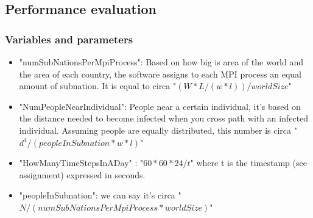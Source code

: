 \documentclass[table, 12pt]{article}
\begin{document}
\subsection{Performance evaluation}

\subsubsection{Variables and parameters}
\begin{flushleft}
\begin{itemize}
\setlength\itemsep{-0.5em}
\item "numSubNationsPerMpiProcess": Based on how big is area of the world and the area of each country, the software assigns to each MPI process an equal amount of subnation. It is equal to circa "$ (W*L/(w*l)) / worldSize $"
\item "NumPeopleNearIndividual": People near a certain individual, it's based on the distance needed to become infected when you cross path with an infected individual. Assuming people are equally distributed, this number is circa "$ d^4 / (peopleInSubnation * w*l) $"
\item "HowManyTimeStepsInADay" : "$ 60 * 60 * 24 / t $" where t is the timestamp (see assignment) expressed in seconds.
\item "peopleInSubnation": we can say it's circa "$ N/(numSubNationsPerMpiProcess * worldSize) $"
\end{itemize}
\end{flushleft}
\end{document}
